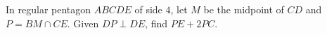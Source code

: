 In regular pentagon $ABCDE$ of side $4$, let $M$ be the midpoint of $CD$ and $P=BM\cap CE$. Given $DP\perp DE$, find $PE+2PC$.
